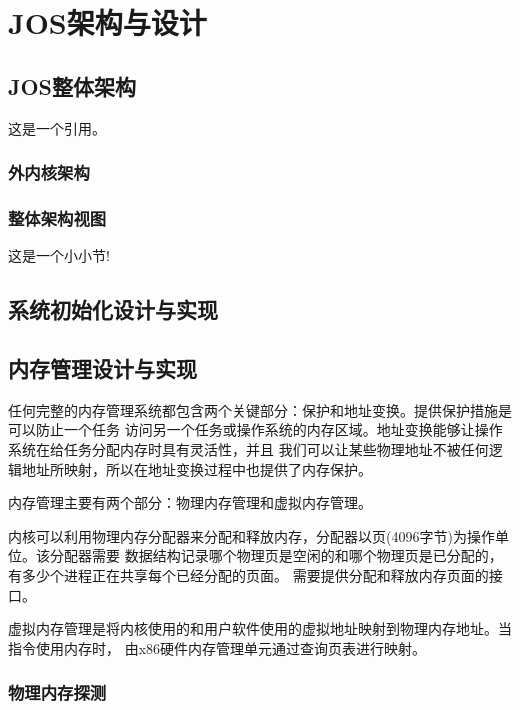 \documentclass[12pt,openany,a4paper]{report}
\begin{document}
\chapter{JOS架构与设计}
	\section{JOS整体架构}
	这是一个引用\cite{prefone, preftwo}。
		\subsection{外内核架构}
		\subsection{整体架构视图}
		这是一个小小节!
	\section{系统初始化设计与实现}
	\section{内存管理设计与实现}
	    任何完整的内存管理系统都包含两个关键部分：保护和地址变换。提供保护措施是可以防止一个任务
	访问另一个任务或操作系统的内存区域。地址变换能够让操作系统在给任务分配内存时具有灵活性，并且
	我们可以让某些物理地址不被任何逻辑地址所映射，所以在地址变换过程中也提供了内存保护。\par
	    内存管理主要有两个部分：物理内存管理和虚拟内存管理。\par
	    内核可以利用物理内存分配器来分配和释放内存，分配器以页(4096字节)为操作单位。该分配器需要
	数据结构记录哪个物理页是空闲的和哪个物理页是已分配的，有多少个进程正在共享每个已经分配的页面。
	需要提供分配和释放内存页面的接口。\par
	    虚拟内存管理是将内核使用的和用户软件使用的虚拟地址映射到物理内存地址。当指令使用内存时，
	由x86硬件内存管理单元通过查询页表进行映射。\par
	\subsection{物理内存探测}
	
\end{document}
